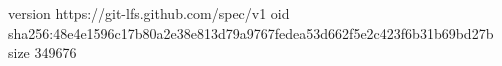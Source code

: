 version https://git-lfs.github.com/spec/v1
oid sha256:48e4e1596c17b80a2e38e813d79a9767fedea53d662f5e2c423f6b31b69bd27b
size 349676
